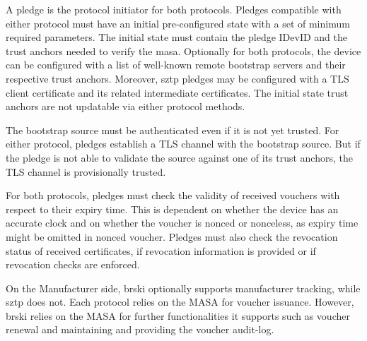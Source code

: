 \par
A pledge is the protocol initiator for both protocols. Pledges compatible with either protocol must have an initial pre-configured state with a set of minimum required parameters. The initial state must contain the pledge IDevID and the trust anchors needed to verify the \gls{masa}. Optionally for both protocols, the device can be configured with a list of well-known remote bootstrap servers and their respective trust anchors. Moreover, \gls{sztp} pledges may be configured with a TLS client certificate and its related intermediate certificates. The initial state trust anchors are not updatable via either protocol methods.
\par
The bootstrap source must be authenticated even if it is not yet trusted. For either protocol, pledges establish a TLS channel with the bootstrap source. But if the pledge is not able to validate the source against one of its trust anchors, the TLS channel is provisionally trusted.
\par
For both protocols, pledges must check the validity of received vouchers with respect to their expiry time. This is dependent on whether the device has an accurate clock and on whether the voucher is nonced or nonceless, as expiry time might be omitted in nonced voucher. Pledges must also check the revocation status of received certificates, if revocation information is provided or if revocation checks are enforced.
\par
On the Manufacturer side, \gls{brski} optionally supports manufacturer tracking, while \gls{sztp} does not. Each protocol relies on the MASA for voucher issuance. However, \gls{brski} relies on the MASA for further functionalities it supports such as voucher renewal and maintaining and providing the voucher audit-log.